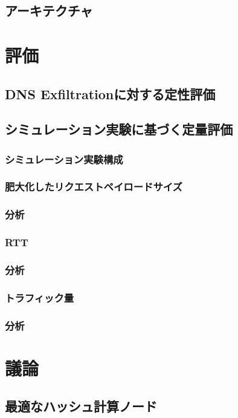 \documentclass[12pt]{jarticle} %
\begin{document}
\subsection{アーキテクチャ}


\newpage
\section{評価}
\subsection{DNS Exfiltrationに対する定性評価}
\subsection{シミュレーション実験に基づく定量評価}
\subsubsection{シミュレーション実験構成}
\subsubsection{肥大化したリクエストペイロードサイズ}
\subsubsection{分析}
\subsubsection{RTT}
\subsubsection{分析}
\subsubsection{トラフィック量}
\subsubsection{分析}

\newpage
\section{議論}
\subsection{最適なハッシュ計算ノード}
\end{document}
